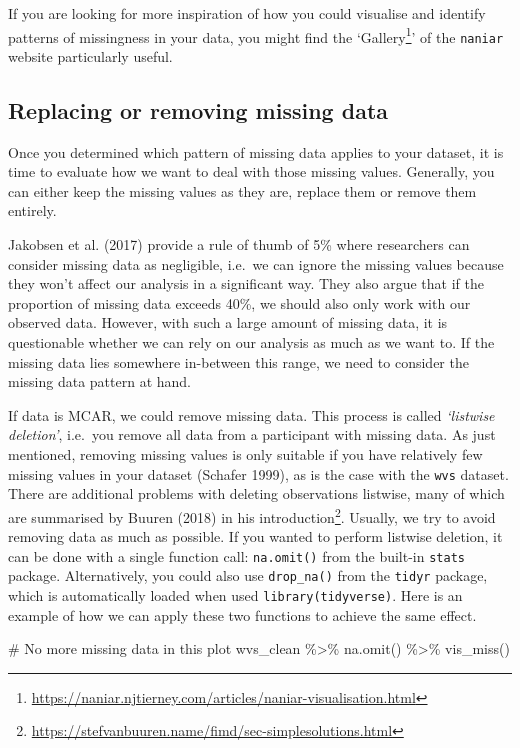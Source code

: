 \documentclass[
  letterpaper,
]{krantz}
\makeatletter
\newenvironment{Shaded}{\begin{snugshade}}{\end{snugshade}}
\newcommand{\CommentTok}[1]{\textcolor[rgb]{0.37,0.37,0.37}{#1}}
\newcommand{\FunctionTok}[1]{\textcolor[rgb]{0.28,0.35,0.67}{#1}}
\newcommand{\NormalTok}[1]{\textcolor[rgb]{0.00,0.23,0.31}{#1}}
\newcommand{\SpecialCharTok}[1]{\textcolor[rgb]{0.37,0.37,0.37}{#1}}
\renewcommand{\href}[2]{#2\footnote{\url{#1}}}
\newenvironment{kframe}{%
\medskip{}
\setlength{\fboxsep}{.8em}
 \def\at@end@of@kframe{}%
 \ifinner\ifhmode%
  \def\at@end@of@kframe{\end{minipage}}%
  \begin{minipage}{\columnwidth}%
 \fi\fi%
 \def\FrameCommand##1{\hskip\@totalleftmargin \hskip-\fboxsep
 \colorbox{shadecolor}{##1}\hskip-\fboxsep
     \hskip-\linewidth \hskip-\@totalleftmargin \hskip\columnwidth}%
 \MakeFramed {\advance\hsize-\width
   \@totalleftmargin\z@ \linewidth\hsize
   \@setminipage}}%
 {\par\unskip\endMakeFramed%
 \at@end@of@kframe}
\renewenvironment{Shaded}{\begin{kframe}}{\end{kframe}}
\makeatother
\begin{document}
If you are looking for more inspiration of how you could visualise and
identify patterns of missingness in your data, you might find the
`\href{https://naniar.njtierney.com/articles/naniar-visualisation.html}{Gallery}'
of the \texttt{naniar} website particularly useful.

\subsection{Replacing or removing missing
data}\label{replacing-removing-missing-data}

Once you determined which pattern of missing data applies to your
dataset, it is time to evaluate how we want to deal with those missing
values. Generally, you can either keep the missing values as they are,
replace them or remove them entirely.

Jakobsen et al. (2017) provide a rule of thumb of 5\% where researchers
can consider missing data as negligible, i.e.~we can ignore the missing
values because they won't affect our analysis in a significant way. They
also argue that if the proportion of missing data exceeds 40\%, we
should also only work with our observed data. However, with such a large
amount of missing data, it is questionable whether we can rely on our
analysis as much as we want to. If the missing data lies somewhere
in-between this range, we need to consider the missing data pattern at
hand.

If data is MCAR, we could remove missing data. This process is called
\emph{`listwise deletion'}, i.e.~you remove all data from a participant
with missing data. As just mentioned, removing missing values is only
suitable if you have relatively few missing values in your dataset
(Schafer 1999), as is the case with the \texttt{wvs} dataset. There are
additional problems with deleting observations listwise, many of which
are summarised by Buuren (2018) in his
\href{https://stefvanbuuren.name/fimd/sec-simplesolutions.html}{introduction}.
Usually, we try to avoid removing data as much as possible. If you
wanted to perform listwise deletion, it can be done with a single
function call: \texttt{na.omit()} from the built-in \texttt{stats}
package. Alternatively, you could also use \texttt{drop\_na()} from the
\texttt{tidyr} package, which is automatically loaded when used
\texttt{library(tidyverse)}. Here is an example of how we can apply
these two functions to achieve the same effect.

\begin{Shaded}
\begin{Highlighting}[]
\CommentTok{\# No more missing data in this plot}
\NormalTok{wvs\_clean }\SpecialCharTok{\%\textgreater{}\%} \FunctionTok{na.omit}\NormalTok{() }\SpecialCharTok{\%\textgreater{}\%} \FunctionTok{vis\_miss}\NormalTok{()}
\end{Highlighting}
\end{Shaded}
\end{document}
